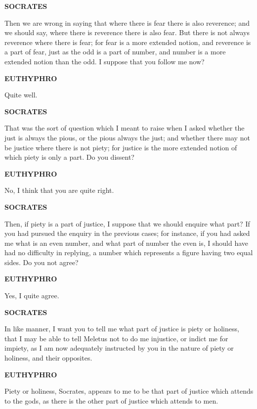 \documentclass[11pt,letter]{article}
\begin{document}
\par \textbf{SOCRATES}
\par   Then we are wrong in saying that where there is fear there is also reverence; and we should say, where there is reverence there is also fear. But there is not always reverence where there is fear; for fear is a more extended notion, and reverence is a part of fear, just as the odd is a part of number, and number is a more extended notion than the odd. I suppose that you follow me now?

\par \textbf{EUTHYPHRO}
\par   Quite well.

\par \textbf{SOCRATES}
\par   That was the sort of question which I meant to raise when I asked whether the just is always the pious, or the pious always the just; and whether there may not be justice where there is not piety; for justice is the more extended notion of which piety is only a part. Do you dissent?

\par \textbf{EUTHYPHRO}
\par   No, I think that you are quite right.

\par \textbf{SOCRATES}
\par   Then, if piety is a part of justice, I suppose that we should enquire what part? If you had pursued the enquiry in the previous cases; for instance, if you had asked me what is an even number, and what part of number the even is, I should have had no difficulty in replying, a number which represents a figure having two equal sides. Do you not agree?

\par \textbf{EUTHYPHRO}
\par   Yes, I quite agree.

\par \textbf{SOCRATES}
\par   In like manner, I want you to tell me what part of justice is piety or holiness, that I may be able to tell Meletus not to do me injustice, or indict me for impiety, as I am now adequately instructed by you in the nature of piety or holiness, and their opposites.

\par \textbf{EUTHYPHRO}
\par   Piety or holiness, Socrates, appears to me to be that part of justice which attends to the gods, as there is the other part of justice which attends to men.
\end{document}
